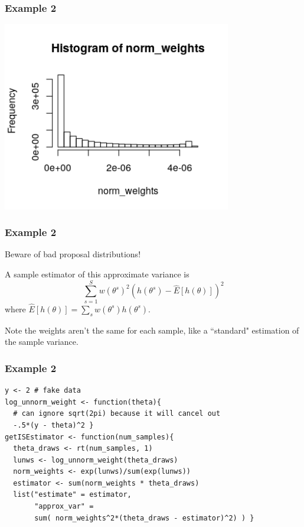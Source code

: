 \documentclass{beamer}
\begin{document}
\begin{frame}[fragile]
\frametitle{Example 2}

\begin{center}
\includegraphics[width=100mm]{is_weights.png}
\end{center}

\end{frame}


\begin{frame}[fragile]
\frametitle{Example 2}

Beware of bad proposal distributions!
\newline

A sample estimator of this approximate variance is
\[
\sum_{s=1}^S w(\theta^s)^2 \left( h(\theta^s) - \hat{E}[h(\theta)]  \right)^2
\]
where $\hat{E}[h(\theta)] = \sum_s w(\theta^s)h(\theta^s)$. 
\newline

Note the weights aren't the same for each sample, like a ``standard" estimation of the sample variance.

\end{frame}

\begin{frame}[fragile]
\frametitle{Example 2}

\begin{verbatim}
y <- 2 # fake data
log_unnorm_weight <- function(theta){ 
  # can ignore sqrt(2pi) because it will cancel out 
  -.5*(y - theta)^2 }
getISEstimator <- function(num_samples){
  theta_draws <- rt(num_samples, 1)
  lunws <- log_unnorm_weight(theta_draws)
  norm_weights <- exp(lunws)/sum(exp(lunws))
  estimator <- sum(norm_weights * theta_draws)
  list("estimate" = estimator, 
       "approx_var" = 
       sum( norm_weights^2*(theta_draws - estimator)^2) ) }
\end{verbatim}


\end{frame}
\end{document}
